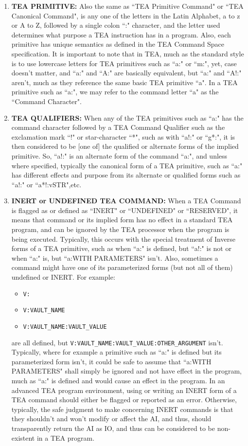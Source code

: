 \documentclass[a4paper, 18pt]{book} %
\begin{document}
\begin{enumerate}
{}
\item{
\textbf{TEA PRIMITIVE:} Also the same as ``TEA Primitive Command" or ``TEA Canonical Command", is any one of the letters in the Latin Alphabet, a to z or A to Z, followed by a single colon ``:" character, and the letter used determines what purpose a TEA instruction has in a program. Also, each primitive has unique semantics as defined in the TEA Command Space specification. It is important to note that in TEA, much as the standard style is to use lowercase letters for TEA primitives such as ``a:" or ``m:", yet, case doesn’t matter, and ``a:" and ``A:" are basically equivalent, but ``a:" and ``A!:" aren't, much as they reference the same basic TEA primitive ``a". In a TEA primitive such as ``a:", we may refer to the command letter ``a" as the ``Command Character".
}
\item{

\textbf{TEA QUALIFIERS:} When any of the TEA primitives such as ``a:" has the command character followed by a TEA Command Qualifier such as the exclamation mark ``!" or star-character ``*", such as with ``a!:" or ``g*:", it is then considered to be [one of] the qualified or alternate forms of the implied primitive. So, ``a!:" is an alternate form of the command ``a:", and unless where specified, typically the canonical form of a TEA primitive, such as ``a:" has different effects and purpose from its alternate or qualified forms such as ``a!:" or ``a*!:vSTR",etc.
}
\item{
\textbf{INERT or UNDEFINED TEA COMMAND:} When a TEA Command is flagged as or defined as ``INERT" or ``UNDEFINED" or ``RESERVED", it means that command or its implied form has no effect in a standard TEA program, and can be ignored by the TEA processor when the program is being executed. Typically, this occurs with the special treatment of Inverse forms of a TEA primitive, such as when ``a:" is defined, but ``a!:" is not or when ``a:" is, but ``a:WITH PARAMETERS" isn't. Also, sometimes a command might have one of its parameterized forms (but not all of them) undefined or INERT. For example:
\begin{itemize}
\item \texttt{V:}
\item \texttt{V:VAULT\_NAME}
\item \texttt{V:VAULT\_NAME:VAULT\_VALUE}
\end{itemize}

are all defined, but \texttt{V:VAULT\_NAME:VAULT\_VALUE:OTHER\_ARGUMENT} isn't. Typically, where for example a primitive such as ``a:" is defined but its parameterized form isn't, it could be safe to assume that ``a:WITH PARAMETERS" shall simply be ignored and not have effect in the program, much as ``a:" is defined and would cause an effect in the program. In an advanced TEA program environment, using or writing an INERT form of a TEA command should either be flagged or reported as an error. Otherwise, typically, the safe judgment to make concerning INERT commands is that they shouldn't and won't modify or affect the AI, and thus, should transparently return the AI as IO, and thus can be considered to be non-existent in a TEA program.
}
\end{enumerate}
\end{document}
